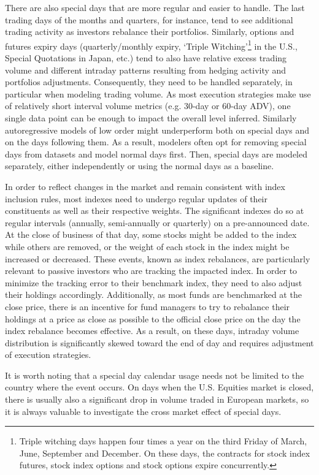 \begin{itemize}
There are also special days that are more regular and easier to handle. The last trading days of the months and quarters, for instance, tend to see additional trading activity as investors rebalance their portfolios. Similarly, options and futures expiry days (quarterly/monthly expiry, `Triple Witching'\footnote{Triple witching days happen four times a year on the third Friday of March, June, September and December. On these days, the contracts for stock index futures, stock index options and stock options expire concurrently.} in the U.S., Special Quotations in Japan, etc.) tend to also have relative excess trading volume and different intraday patterns resulting from hedging activity and portfolios adjustments. Consequently, they need to be handled separately, in particular when modeling trading volume. As most execution strategies make use of relatively short interval volume metrics (e.g. 30-day or 60-day ADV), one single data point can be enough to impact the overall level inferred. Similarly autoregressive models of low order might underperform both on special days and on the days following them. As a result, modelers often opt for removing special days from datasets and model normal days first. Then, special days are modeled separately, either independently or using the normal days as a baseline. 

In order to reflect changes in the market and remain consistent with index inclusion rules, most indexes need to undergo regular updates of their constituents as well as their respective weights. The significant indexes do so at regular intervals (annually, semi-annually or quarterly) on a pre-announced date. At the close of business of that day, some stocks might be added to the index while others are removed, or the weight of each stock in the index might be increased or decreased. These events, known as index rebalances, are particularly relevant to passive investors who are tracking the impacted index. In order to minimize the tracking error to their benchmark index, they need to also adjust their holdings accordingly. Additionally, as most funds are benchmarked at the close price, there is an incentive for fund managers to try to rebalance their holdings at a price as close as possible to the official close price on the day the index rebalance becomes effective. As a result, on these days, intraday volume distribution is significantly skewed toward the end of day and requires adjustment of execution strategies.

It is worth noting that a special day calendar usage needs not be limited to the country where the event occurs. On days when the U.S. Equities market is closed, there is usually also a significant drop in volume traded in European markets, so it is always valuable to investigate the cross market effect of special days.



\end{itemize}
